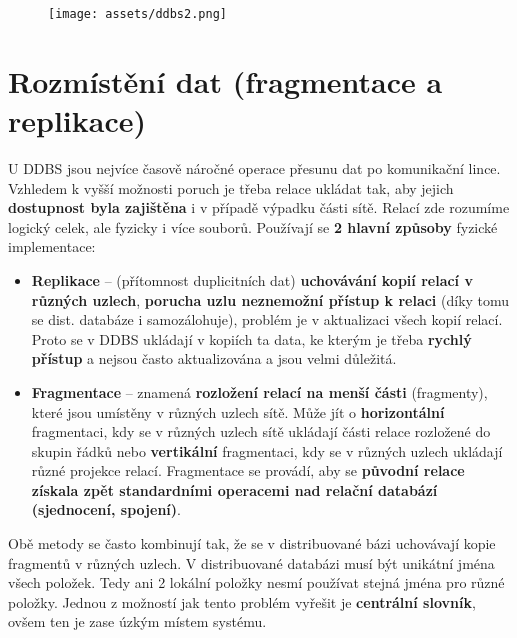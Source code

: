 \begin{figure}[H]
  \centering
  \texttt{[image: assets/ddbs2.png]}
\end{figure}
\section{Rozmístění dat (fragmentace a replikace)}
U DDBS jsou nejvíce časově náročné operace přesunu dat po komunikační lince. Vzhledem k vyšší možnosti poruch je třeba relace ukládat tak, aby jejich \textbf{dostupnost byla zajištěna} i v případě výpadku části sítě. Relací zde rozumíme logický celek, ale fyzicky i více souborů. Používají se \textbf{2 hlavní způsoby} fyzické implementace:
\begin{itemize}
  \item \textbf{Replikace} -- (přítomnost duplicitních dat) \textbf{uchovávání kopií relací v různých uzlech}, \textbf{porucha uzlu neznemožní přístup k relaci} (díky tomu se dist. databáze i samozálohuje), problém je v aktualizaci všech kopií relací. Proto se v DDBS ukládají v kopiích ta data, ke kterým je třeba \textbf{rychlý přístup} a nejsou často aktualizována a jsou velmi důležitá.
  \item \textbf{Fragmentace} --  znamená \textbf{rozložení relací na menší části} (fragmenty), které jsou umístěny v různých
        uzlech sítě. Může jít o \textbf{horizontální} fragmentaci, kdy se v různých uzlech sítě ukládají části relace rozložené do skupin řádků nebo \textbf{vertikální} fragmentaci, kdy se v různých uzlech ukládají různé	projekce relací. Fragmentace se provádí, aby se \textbf{původní relace získala zpět standardními operacemi nad relační databází (sjednocení, spojení)}.
\end{itemize}
Obě metody se často kombinují tak, že se v distribuované bázi uchovávají kopie fragmentů v různých uzlech.
V distribuované databázi musí být unikátní jména všech položek. Tedy ani 2 lokální položky nesmí používat
stejná jména pro různé položky. Jednou z možností jak tento problém vyřešit je \textbf{centrální slovník}, ovšem ten
je zase úzkým místem systému.